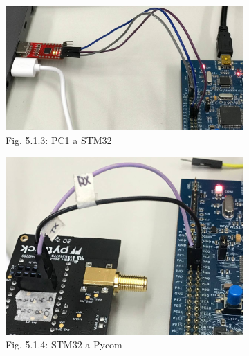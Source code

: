 \documentclass[12pt]{article}
\begin{document}
\begin{figure}[ht]
  \centering
  \begin{subfigure}[b]{0.45\linewidth}
    \includegraphics[width=\linewidth]{images/SMT32-PyCom-1.png}
    \caption{Fig. 5.1.3: PC1 a STM32}
  \end{subfigure}
  \begin{subfigure}[b]{0.45\linewidth}
    \includegraphics[width=\linewidth]{images/SMT32-PyCom-2.png}
    \caption{Fig. 5.1.4: STM32 a Pycom}
  \end{subfigure}
  \begin{subfigure}[c]{0.45\linewidth}

\end{subfigure}
\end{figure}
\end{document}
